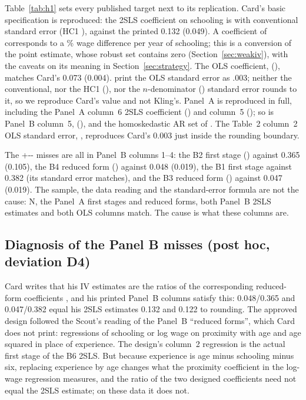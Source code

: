 \documentclass[11pt]{article}
\newcommand{\HOneMisses}{\the\numexpr\HOnePrimaryTargets+\HOneSecondaryTargets-\HOnePrimaryReproduced-\HOneSecondaryReproduced\relax}
\begin{document}


Table~\ref{tab:h1} sets every published target next to its replication. Card's basic
specification is reproduced: the 2SLS coefficient on schooling is \IvReturn{} with
conventional standard error \IvReturnSe{} (HC1 \IvReturnSeRobust{}), against the printed
0.132 (0.049). A coefficient of \IvReturn{} corresponds to a \IvReturnPct\% wage difference %
per year of schooling; this is a conversion of the point estimate, whose robust set
contains zero (Section~\ref{sec:weakiv}), with the caveats on its meaning in
Section~\ref{sec:strategy}. The OLS coefficient, \OlsReturn{} (\OlsReturnSe{}), matches
Card's 0.073 (0.004). \citet{kling2001interpreting} print the OLS standard error as .003; %
neither the conventional, nor the HC1 (\OlsReturnSeRobust{}), nor the $n$-denominator
(\OlsReturnSeN{}) standard error rounds to it, so we reproduce Card's value and not Kling's.
Panel~A is reproduced in full, including the Panel~A column~6 2SLS coefficient
\ASixIv{} (\ASixIvSe{}) and column~5 \AFiveIv{} (\AFiveIvSe{}); so is Panel~B column~5,
\BFiveIv{} (\BFiveIvSe{}), and the homoskedastic AR set of \citet{cinelli2025omitted}. The
Table~2 column~2 OLS standard error, \AFiveOlsSe{}, reproduces Card's 0.003 just inside the %
rounding boundary.

The \HOneMisses{} misses are all in Panel~B columns 1--4: the B2 first stage \FirstStage{}
(\FirstStageSe{}) against 0.365 (0.105), the B4 reduced form \ReducedForm{} %
(\ReducedFormSe{}) against 0.048 (0.019), the B1 first stage \BOneFs{} against 0.382 (its %
standard error matches), and the B3 reduced form \BThreeRf{} (\BThreeRfSe{}) against 0.047 %
(0.019). The sample, the data reading and the standard-error formula are not the cause: N, %
the Panel~A first stages and reduced forms, both Panel~B 2SLS estimates and both OLS
columns match. The cause is what these columns are.

\subsection{Diagnosis of the Panel B misses (post hoc, deviation D4)}
\label{sec:diag}



Card writes that his IV estimates are the ratios of the corresponding reduced-form
coefficients \citep[p.~12]{card1993nber}, and his printed Panel~B columns satisfy this:
0.048/0.365 and 0.047/0.382 equal his 2SLS estimates 0.132 and 0.122 to rounding. The %
approved design followed the Scout's reading of the Panel~B ``reduced forms'', which Card
does not print: regressions of schooling or log wage on proximity with age and age squared
in place of experience. The design's column~2 regression is the actual first stage of the
B6 2SLS. But because experience is age minus schooling minus six, replacing experience by
age changes what the proximity coefficient in the log-wage regression measures, and the
ratio of the two designed coefficients need not equal the 2SLS estimate; on these data it
does not.
\end{document}
